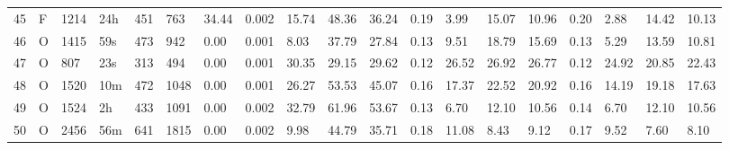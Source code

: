 \begin{tabular}{rllllllrlllllllllll}
45 & F & 1214 & 24h & 451 & 763 & 34.44 & 0.002 & 15.74 & 48.36 & 36.24 & 0.19 & 3.99 & 15.07 & 10.96 & 0.20 & 2.88 & 14.42 & 10.13 \\
46 & O & 1415 & 59s & 473 & 942 & 0.00 & 0.001 & 8.03 & 37.79 & 27.84 & 0.13 & 9.51 & 18.79 & 15.69 & 0.13 & 5.29 & 13.59 & 10.81 \\
47 & O & 807 & 23s & 313 & 494 & 0.00 & 0.001 & 30.35 & 29.15 & 29.62 & 0.12 & 26.52 & 26.92 & 26.77 & 0.12 & 24.92 & 20.85 & 22.43 \\
48 & O & 1520 & 10m & 472 & 1048 & 0.00 & 0.001 & 26.27 & 53.53 & 45.07 & 0.16 & 17.37 & 22.52 & 20.92 & 0.16 & 14.19 & 19.18 & 17.63 \\
49 & O & 1524 & 2h & 433 & 1091 & 0.00 & 0.002 & 32.79 & 61.96 & 53.67 & 0.13 & 6.70 & 12.10 & 10.56 & 0.14 & 6.70 & 12.10 & 10.56 \\
50 & O & 2456 & 56m & 641 & 1815 & 0.00 & 0.002 & 9.98 & 44.79 & 35.71 & 0.18 & 11.08 & 8.43 & 9.12 & 0.17 & 9.52 & 7.60 & 8.10 \\
\bottomrule
\end{tabular}
